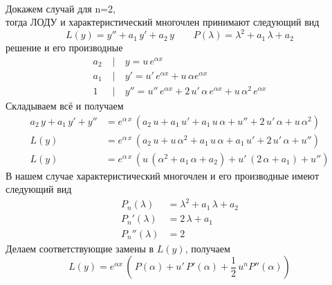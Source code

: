 \begin{Proof}~\\
    Докажем случай для n=2,\\
    тогда ЛОДУ и характеристический многочлен принимают следующий вид 
    \[
        L(y) = y'' + a_1\,y' + a_2\,y \qquad P(\lambda) = \lambda^2 + a_1\,\lambda + a_2
    \]
    решение и его производные
    \begin{align*}
        a_2\; &| \quad y=u\,e^{\alpha x}\\
        a_1\; &| \quad y'=u'\,e^{\alpha x}+u\,\alpha e^{\alpha x}\\
        1\; &| \quad y''=u''\,e^{\alpha x}+2\,u'\,\alpha\,e^{\alpha x}+u\,\alpha^2\,e^{\alpha x} 
    \end{align*}
    Складываем всё и получаем
    \begin{align*}
        a_2\,y + a_1\,y' + y'' &= e^{\alpha\,x}\,(a_2\,u + a_1\,u' + a_1\,u\,\alpha + u'' + 2\,u'\,\alpha + u\,\alpha^2)\\
        L(y) &= e^{\alpha\,x}\,(a_2\,u + u\,\alpha^2 + a_1\,u\,\alpha + a_1\,u' + 2\,u'\,\alpha + u'')\\
        L(y) &= e^{\alpha\,x}\,(u\,(\alpha^2 + a_1\,\alpha + a_2) + u'\,(2\,\alpha + a_1) + u'')
    \end{align*}
    В нашем случае характеристический многочлен и его производные имеют следующий вид
    \begin{align*}
        P_n(\lambda) &= \lambda^2 + a_1\,\lambda + a_2\\
        P_n'(\lambda) &= 2\,\lambda + a_1\\
        P_n''(\lambda) &= 2
    \end{align*}
    Делаем соответствующие замены в $L(y)$, получаем
    \[
        L(y)=e^{\alpha x}\,\left(\,P(\alpha)+u'\,P'(\alpha)+\frac{1}{2}\,u^n P''(\alpha)\right)
    \]
\end{Proof}

\pagebreak

